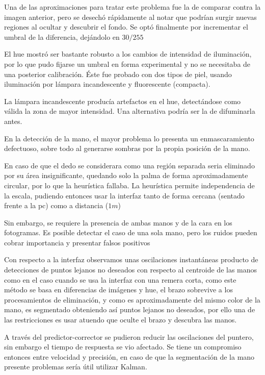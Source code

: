 \documentclass[portrait,a0paper,fontscale=0.277]{baposter}
\begin{document}
\begin{poster}
{Una de las aproximaciones para tratar este problema fue la de comparar contra la imagen anterior, pero se desechó rápidamente al notar que podrían surgir nuevas regiones al ocultar y descubrir el fondo.
Se optó finalmente por incrementar el umbral de la diferencia, dejándolo en $30/255$

		El hue mostró ser bastante robusto a los cambios de intensidad de iluminación, por lo que pudo fijarse un umbral en forma experimental y no se necesitaba de una posterior calibración. 
Éste fue probado con dos tipos de piel, usando iluminación por lámpara incandescente y fluorescente (compacta).

	La lámpara incandescente producía artefactos en el hue, detectándose como válida la zona de mayor intensidad. Una alternativa podría ser la de difuminarla antes.
	
	En la detección de la mano, el mayor problema lo presenta un enmascaramiento defectuoso, sobre todo al generarse sombras por la propia posición de la mano.

En caso de que el dedo se considerara como una región separada seria eliminado por su área insignificante, quedando solo la palma
de forma aproximadamente circular, por lo que la heurística fallaba.
	La heurística permite independencia de la escala, pudiendo entonces usar la interfaz tanto de forma cercana (sentado frente a la pc) como a distancia ($1m$) %

	Sin embargo, se requiere la presencia de ambas manos y de la cara en los fotogramas. Es posible detectar el caso de una sola mano, pero los ruidos pueden cobrar importancia y presentar falsos positivos

		Con respecto a la interfaz observamos unas oscilaciones instantáneas producto de detecciones de puntos lejanos no deseados con respecto al centroide de las manos como en el caso cuando se usa la interfaz con una remera corta, como este método se basa en diferencias de imágenes y hue, el brazo sobrevive a los procesamientos  de eliminación, y como es aproximadamente del mismo color de la mano, es segmentado obteniendo así puntos lejanos no deseados, por ello una de las restricciones es usar  atuendo que oculte el brazo y descubra las manos.

		A través del predictor-corrector se pudieron reducir las oscilaciones del puntero, 
	sin embargo el tiempo de respuesta se vio afectado. 
	Se tiene un compromiso entonces entre velocidad y precisión, en caso de que la segmentación de la mano
	presente problemas sería útil utilizar Kalman.
	}
\end{poster}
\end{document}
